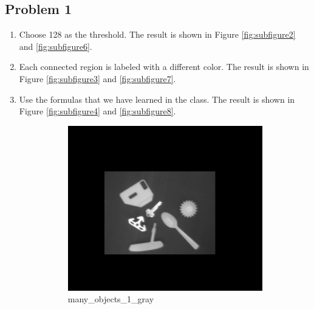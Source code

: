 \documentclass[bwprint]{gmcmthesis}
\numberwithin{figure}{section}
\begin{document}
\subsection{Problem 1}
\begin{enumerate}[label=\alph*.]
    \item Choose 128 as the threshold. The result is shown in Figure \ref{fig:subfigure2} and \ref{fig:subfigure6}.
    \item Each connected region is labeled with a different color. The result is shown in Figure \ref{fig:subfigure3} and \ref{fig:subfigure7}.
    \item Use the formulas that we have learned in the class. The result is shown in Figure \ref{fig:subfigure4} and \ref{fig:subfigure8}.
    \begin{figure}[h]
        \centering
        \begin{subfigure}[b]{0.3\textwidth}
            \centering
            \includegraphics[width=\textwidth]{../output/many_objects_1_gray.png}
            \caption{many\_objects\_1\_gray}
            \label{fig:subfigure1}
        \end{subfigure}
        \hfill
        \begin{subfigure}[b]{0.3\textwidth}
            \centering

\end{subfigure}
\end{figure}
\end{enumerate}
\end{document}
